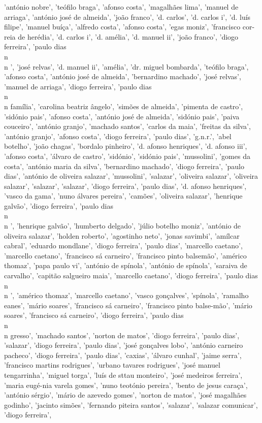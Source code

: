 \documentclass{article}
\begin{document}
\begin{itemize}
'antónio nobre', 'teófilo braga', 'afonso costa', 'magalhães lima', 'manuel de arriaga', 'antónio josé de almeida', 'joão franco', 'd. carlos', 'd. carlos i', 'd. luís filipe', 'manuel buíça', 'alfredo costa', 'afonso costa', 'egas moniz', 'francisco cor- reia de herédia', 'd. carlos i', 'd. amélia', 'd. manuel ii', 'joão franco', 'diogo ferreira', 'paulo dias\\n\\n ', 'josé relvas', 'd. manuel ii', 'amélia', 'dr. miguel bombarda', 'teófilo braga', 'afonso costa', 'antónio josé de almeida', 'bernardino machado', 'josé relvas', 'manuel de arriaga', 'diogo ferreira', 'paulo dias\\n\\n família', 'carolina beatriz ângelo', 'simões de almeida', 'pimenta de castro', 'sidónio pais', 'afonso costa', 'antónio josé de almeida', 'sidónio pais', 'paiva couceiro', 'antónio granjo', 'machado santos', 'carlos da maia', 'freitas da silva', 'antónio granjo', 'afonso costa', 'diogo ferreira', 'paulo dias', 'g.n.r.', 'abel botelho', 'joão chagas', 'bordalo pinheiro', 'd. afonso henriques', 'd. afonso iii', 'afonso costa', 'álvaro de castro', 'sidónio', 'sidónio pais', 'mussolini', 'gomes da costa', 'antónio maria da silva', 'bernardino machado', 'diogo ferreira', 'paulo dias', 'antónio de oliveira salazar', 'mussolini', 'salazar', 'oliveira salazar', 'oliveira salazar', 'salazar', 'salazar', 'diogo ferreira', 'paulo dias', 'd. afonso henriques', 'vasco da gama', 'nuno álvares pereira', 'camões', 'oliveira salazar', 'henrique galvão', 'diogo ferreira', 'paulo dias\\n\\n ', 'henrique galvão', 'humberto delgado', 'júlio botelho moniz', 'antónio de oliveira salazar', 'holden roberto', 'agostinho neto', 'jonas savimbi', 'amílcar cabral', 'eduardo mondlane', 'diogo ferreira', 'paulo dias', 'marcello caetano', 'marcello caetano', 'francisco sá carneiro', 'francisco pinto balsemão', 'américo thomaz', 'papa paulo vi', 'antónio de spínola', 'antónio de spínola', 'saraiva de carvalho', 'capitão salgueiro maia', 'marcello caetano', 'diogo ferreira', 'paulo dias\\n\\n ', 'américo thomaz', 'marcello caetano', 'vasco gonçalves', 'spínola', 'ramalho eanes', 'mário soares', 'francisco sá carneiro', 'francisco pinto balse-mão', 'mário soares', 'francisco sá carneiro', 'diogo ferreira', 'paulo dias\\n\\n gresso', 'machado santos', 'norton de matos', 'diogo ferreira', 'paulo dias', 'salazar', 'diogo ferreira', 'paulo dias', 'josé gonçalves lobo', 'antónio carneiro pacheco', 'diogo ferreira', 'paulo dias', 'caxias', 'álvaro cunhal', 'jaime serra', 'francisco martins rodrigues', 'urbano tavares rodrigues', 'josé manuel tengarrinha', 'miguel torga', 'luís de sttau monteiro', 'josé medeiros ferreira', 'maria eugé-nia varela gomes', 'nuno teotónio pereira', 'bento de jesus caraça', 'antónio sérgio', 'mário de azevedo gomes', 'norton de matos', 'josé magalhães godinho', 'jacinto simões', 'fernando piteira santos', 'salazar', 'salazar comunicar', 'diogo ferreira', 
\end{itemize}
\end{document}
